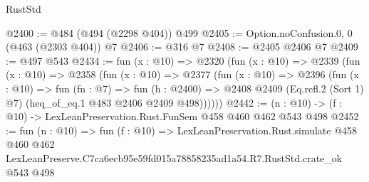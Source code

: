 \begin{lexlean}{RustStd}
\begin{coremodule}
@2400 := @484 (@494 (@2298 @404)) @499
@2405 := Option.noConfusion.{0, 0} (@463 (@2303 @404)) @7
@2406 := @316 @7
@2408 := @2405 @2406 @7
@2409 := @497 @543
@2434 := fun (x : @10) =>
  @2320
    (fun (x : @10) =>
    @2339
      (fun (x : @10) =>
      @2358
        (fun (x : @10) =>
        @2377
          (fun (x : @10) =>
          @2396
            (fun (x : @10) =>
            fun (fn : @7) =>
            fun (h : @2400) =>
            @2408 @2409 (Eq.refl.{2} (Sort 1) @7) (heq_of_eq.{1} @483 @2406 @2409 @498))))))
@2442 := (n : @10) -> (f : @10) -> LexLeanPreservation.Rust.FunSem @458 @460 @462 @543 @498
@2452 := fun (n : @10) =>
  fun (f : @10) =>
  LexLeanPreservation.Rust.simulate
    @458
    @460
    @462
    LexLeanPreserve.C7ca6ecb95e59fd015a78858235ad1a54.R7.RustStd.crate_ok
    @543
    @498
\end{coremodule}
\end{lexlean}
